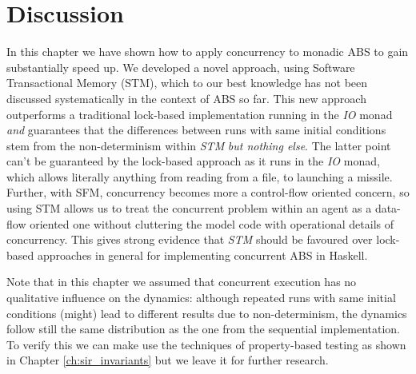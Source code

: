 \section{Discussion}
In this chapter we have shown how to apply concurrency to monadic ABS to gain substantially speed up. We developed a novel approach, using Software Transactional Memory (STM), which to our best knowledge has not been discussed systematically in the context of ABS so far. This new approach outperforms a traditional lock-based implementation running in the \textit{IO} monad \textit{and} guarantees that the differences between runs with same initial conditions stem from the non-determinism within \textit{STM} \textit{but nothing else}. The latter point can't be guaranteed by the lock-based approach as it runs in the \textit{IO} monad, which allows literally anything from reading from a file, to launching a missile. Further, with SFM, concurrency becomes more a control-flow oriented concern, so using STM allows us to treat the concurrent problem within an agent as a data-flow oriented one without cluttering the model code with operational details of concurrency. This gives strong evidence that \textit{STM} should be favoured over lock-based approaches in general for implementing concurrent ABS in Haskell.

Note that in this chapter we assumed that concurrent execution has no qualitative influence on the dynamics: although repeated runs with same initial conditions (might) lead to different results due to non-determinism, the dynamics follow still the same distribution as the one from the sequential implementation. To verify this we can make use the techniques of property-based testing as shown in Chapter \ref{ch:sir_invariants} but we leave it for further research.

